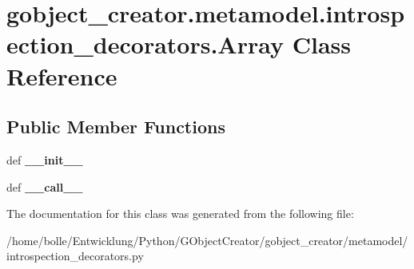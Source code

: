 \hypertarget{classgobject__creator_1_1metamodel_1_1introspection__decorators_1_1Array}{
\section{gobject\_\-creator.metamodel.introspection\_\-decorators.Array Class Reference}
\label{classgobject__creator_1_1metamodel_1_1introspection__decorators_1_1Array}
}
\subsection*{Public Member Functions}
\begin{DoxyCompactItemize}
\item 
\hypertarget{classgobject__creator_1_1metamodel_1_1introspection__decorators_1_1Array_a77cf409b719ae2863bebc94164ff86dd}{
def {\bfseries \_\-\_\-init\_\-\_\-}}
\label{classgobject__creator_1_1metamodel_1_1introspection__decorators_1_1Array_a77cf409b719ae2863bebc94164ff86dd}

\item 
\hypertarget{classgobject__creator_1_1metamodel_1_1introspection__decorators_1_1Array_a41b7775332a7df16e6d8f72c92ba9210}{
def {\bfseries \_\-\_\-call\_\-\_\-}}
\label{classgobject__creator_1_1metamodel_1_1introspection__decorators_1_1Array_a41b7775332a7df16e6d8f72c92ba9210}

\end{DoxyCompactItemize}


The documentation for this class was generated from the following file:\begin{DoxyCompactItemize}
\item 
/home/bolle/Entwicklung/Python/GObjectCreator/gobject\_\-creator/metamodel/introspection\_\-decorators.py\end{DoxyCompactItemize}
